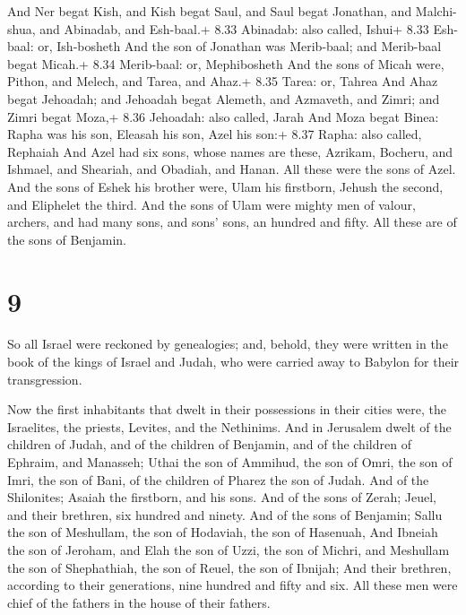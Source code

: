  And Ner begat Kish, and Kish begat Saul, and Saul begat
Jonathan, and Malchi-shua, and Abinadab, and Esh-baal.+ 8.33 Abinadab:
also called, Ishui+ 8.33 Esh-baal: or, Ish-bosheth  And the
son of Jonathan was Merib-baal; and Merib-baal begat Micah.+ 8.34
Merib-baal: or, Mephibosheth  And the sons of Micah were,
Pithon, and Melech, and Tarea, and Ahaz.+ 8.35 Tarea: or, Tahrea
 And Ahaz begat Jehoadah; and Jehoadah begat Alemeth, and
Azmaveth, and Zimri; and Zimri begat Moza,+ 8.36 Jehoadah: also called,
Jarah  And Moza begat Binea: Rapha was his son, Eleasah his
son, Azel his son:+ 8.37 Rapha: also called, Rephaiah  And
Azel had six sons, whose names are these, Azrikam, Bocheru, and Ishmael,
and Sheariah, and Obadiah, and Hanan. All these were the sons of Azel.
 And the sons of Eshek his brother were, Ulam his
firstborn, Jehush the second, and Eliphelet the third.  And
the sons of Ulam were mighty men of valour, archers, and had many sons,
and sons' sons, an hundred and fifty. All these are of the sons of
Benjamin.

\hypertarget{section-8}{%
\section{9}\label{section-8}}

 So all Israel were reckoned by genealogies; and, behold,
they were written in the book of the kings of Israel and Judah, who were
carried away to Babylon for their transgression.

 Now the first inhabitants that dwelt in their possessions
in their cities were, the Israelites, the priests, Levites, and the
Nethinims.  And in Jerusalem dwelt of the children of Judah,
and of the children of Benjamin, and of the children of Ephraim, and
Manasseh;  Uthai the son of Ammihud, the son of Omri, the
son of Imri, the son of Bani, of the children of Pharez the son of
Judah.  And of the Shilonites; Asaiah the firstborn, and his
sons.  And of the sons of Zerah; Jeuel, and their brethren,
six hundred and ninety.  And of the sons of Benjamin; Sallu
the son of Meshullam, the son of Hodaviah, the son of Hasenuah,
 And Ibneiah the son of Jeroham, and Elah the son of Uzzi,
the son of Michri, and Meshullam the son of Shephathiah, the son of
Reuel, the son of Ibnijah;  And their brethren, according to
their generations, nine hundred and fifty and six. All these men were
chief of the fathers in the house of their fathers.

